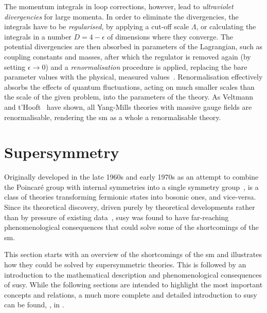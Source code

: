 The momentum integrals in loop corrections, however, lead to \textit{ultraviolet divergencies} for large momenta. In order to eliminate the divergencies, the integrals have to be \textit{regularised}, \eg by applying a cut-off scale $\Lambda$, or calculating the integrals in a number $D = 4-\epsilon$ of dimensions where they converge. The potential divergencies are then absorbed in parameters of the Lagrangian, such as coupling constants and masses, after which the regulator is removed again (\eg by setting $\epsilon\rightarrow 0$) and a \textit{renormalisation} procedure is applied, replacing the bare parameter values with the physical, measured values~\cite{Brock:1354959}. Renormalisation effectively absorbs the effects of quantum fluctuations, acting on much smaller scales than the scale of the given problem, into the parameters of the theory.
As Veltmann and t'Hooft~\cite{THOOFT1972189,THOOFT1971173} have shown, all Yang-Mills theories with massive gauge fields are renormalisable, rendering the \gls{sm} as a whole a renormalisable theory.  

\section{Supersymmetry}

Originally developed in the late 1960s and early 1970s as an attempt to combine the Poincaré group with internal symmetries into a single symmetry group~\cite{kane2000the},  is a class of theories transforming fermionic states into bosonic ones, and vice-versa. Since its theoretical discovery, driven purely by theoretical developments rather than by pressure of existing data~\cite{kane2000the}, \gls{susy} was found to have far-reaching phenomenological consequences that could solve some of the shortcomings of the \gls{sm}. 

This section starts with an overview of the shortcomings of the \gls{sm} and illustrates how they could be solved by supersymmetric theories. This is followed by an introduction to the mathematical description and phenomenological consequences of \gls{susy}. While the following sections are intended to highlight the most important concepts and relations, a much more complete and detailed introduction to \gls{susy} can be found, \eg, in \cite{Martin:1997ns,Bustamante:2009us}.


